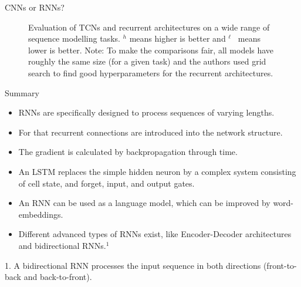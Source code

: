 \documentclass[11pt,compress,t,notes=noshow]{beamer}
\begin{document}
\begin{frame} {CNNs or RNNs?}
  \begin{figure}
      \centering
      \caption{\footnotesize{Evaluation of TCNs and recurrent architectures on a wide range of sequence modelling tasks. $^h$ means higher is better and ${}^\ell$~ means lower is better. Note: To make the comparisons fair, all models have roughly the same size (for a given task) and the authors used grid search to find good hyperparameters for the recurrent architectures.}}
  \end{figure}
\end{frame}


\begin{frame}{Summary}
\begin{itemize}
\item RNNs are specifically designed to process sequences of varying lengths. 
\item  For that recurrent connections are introduced into the network structure.
\item The gradient is calculated by backpropagation through time.
\item  An LSTM replaces the  simple hidden neuron by a complex system consisting of cell state, and forget, input, and output gates.
\item An RNN can be used as a language model, which can be improved by word-embeddings.
\item Different advanced types of RNNs exist, like Encoder-Decoder architectures and bidirectional RNNs.$^1$
\end{itemize}

\vspace{8mm}
\tiny{1. A bidirectional RNN processes the input sequence in both directions (front-to-back and back-to-front).}

\end{frame}
\end{document}
